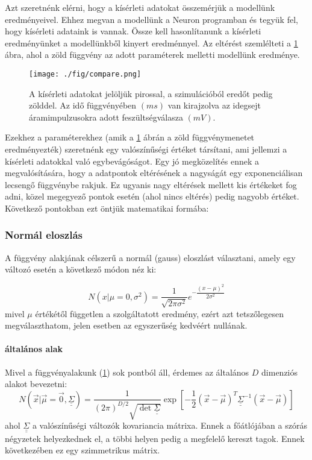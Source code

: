 Azt szeretnénk elérni, hogy a kísérleti adatokat összemérjük a modellünk eredményeivel. Ehhez megvan a modellünk a Neuron programban és tegyük fel, hogy kísérleti adataink is vannak. Össze kell hasonlítanunk a kísérleti eredményünket a modellünkből kinyert eredménnyel. Az eltérést szemlélteti a \ref{fig:compare} ábra, ahol a zöld függvény az adott paraméterek melletti modellünk eredménye.
\begin{figure}[!htb]
	\centering
	\texttt{[image: ./fig/compare.png]}
	\caption[Kísérletből és szimulációvól származó adatok]{A kísérleti adatokat jelöljük pirossal, a szimulációból eredőt pedig zölddel. Az idő függvényében $(ms)$ van kirajzolva az idegsejt áramimpulzusokra adott feszültségválasza $(mV)$.}
	\label{fig:compare}
\end{figure}
Ezekhez a paraméterekhez (amik a \ref{fig:compare} ábrán a zöld függvénymenetet eredményezték) szeretnénk egy valószínűségi értéket társítani, ami jellemzi a kísérleti adatokkal való egybevágóságot. Egy jó megközelítés ennek a megvalósítására, hogy a adatpontok eltérésének a nagyságát egy exponenciálisan lecsengő függvénybe rakjuk. Ez ugyanis nagy eltérések mellett kis értékeket fog adni, közel megegyező pontok esetén (ahol nincs eltérés) pedig nagyobb értéket. Következő pontokban ezt öntjük matematikai formába:


\subsubsection{Normál eloszlás}
A függvény alakjának célszerű a normál (gauss) eloszlást választani, amely egy változó esetén a következő módon néz ki:

\begin{equation}\label{eq:gauss}
	N\left(x|\mu=0, \sigma^2\right) = \dfrac{1}{\sqrt{2\pi \sigma^2}}e^{-\dfrac{\left(x-\mu\right)^2}{2\sigma^2}}
\end{equation}
mivel $\mu$ értékétől független a szolgáltatott eredmény, ezért azt tetszőlegesen megválaszthatom, jelen esetben az egyszerűség kedvéért nullának. 

\paragraph{általános alak}
Mivel a függvényalakunk (\ref{fig:compare}) sok pontból áll, érdemes az általános $D$ dimenziós alakot bevezetni:
\begin{equation}\label{eq:gaussD}
	N\left(\vec{x}|\vec{\mu}=\vec{0}, \underline{\underline{ \Sigma }}\right) = \dfrac{1}{\left(2\pi\right)^{D/2} \sqrt{\det \underline{\underline{ \Sigma }}}}\exp\left[-\dfrac{1}{2}\left(\vec{x}-\vec{\mu}\right)^T \underline{\underline{ \Sigma }}^{-1}\left(\vec{x}-\vec{\mu}\right)\right]
\end{equation}
ahol $\underline{\underline{ \Sigma }}$ a valószínűségi változók kovariancia mátrixa. Ennek a főátlójában a szórás négyzetek helyezkednek el, a többi helyen pedig a megfelelő kereszt tagok. Ennek következében ez egy szimmetrikus mátrix. 


